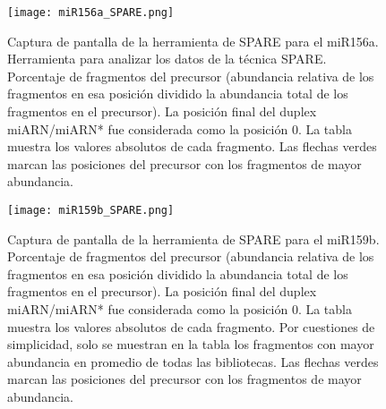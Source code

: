 \begin{landscape}
    \begin{figure}[htbp!] 
        \centering    
        \texttt{[image: miR156a\_SPARE.png]}
        \caption[Captura de pantalla de la herramienta de SPARE para el miR156a]{Captura de pantalla de la herramienta de SPARE para el miR156a.
        Herramienta para analizar los datos de la técnica SPARE.
        Porcentaje de fragmentos del precursor (abundancia relativa de los fragmentos en esa posición dividido la abundancia total de los fragmentos en el precursor).
        La posición final del duplex miARN/miARN* fue considerada como la posición 0.
        La tabla muestra los valores absolutos de cada fragmento.
        Las flechas verdes marcan las posiciones del precursor con los fragmentos de mayor abundancia. 
        }
         \label{fig:miR156a_SPARE}
    \end{figure}
\end{landscape}



\begin{landscape}
    \begin{figure}[htbp!] 
        \centering    
        \texttt{[image: miR159b\_SPARE.png]}
		\caption[Captura de pantalla de la herramienta de SPARE para el miR159b]{Captura de pantalla de la herramienta de SPARE para el miR159b.
        Porcentaje de fragmentos del precursor (abundancia relativa de los fragmentos en esa posición dividido la abundancia total de los fragmentos en el precursor).
        La posición final del duplex miARN/miARN* fue considerada como la posición 0.
        La tabla muestra los valores absolutos de cada fragmento.
        Por cuestiones de simplicidad, solo se muestran en la tabla los fragmentos con mayor abundancia en promedio de todas las bibliotecas.
        Las flechas verdes marcan las posiciones del precursor con los fragmentos de mayor abundancia.
        }
		\label{fig:miR159b_SPARE}
    \end{figure}
\end{landscape}


